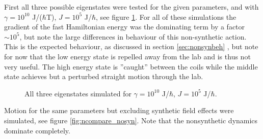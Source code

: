 \documentclass[main.tex]{subfiles}
\begin{document}
First all three possible eigenstates were tested for the given parameters, and with
\(\gamma = 10^{10}\) J/(\(\hbar{}\)T), \(J = 10^5\) J/\(\hbar{}\), see figure
\ref{fig:ncompare}. For all of these simulations the gradient of the fast Hamiltonian
energy was the dominating term by a factor \(\sim 10^{5}\), but note the large differences
in behaviour of this non-synthetic action. This is the expected behaviour, as discussed in
section \ref{sec:nonsynbeh}
, but note for now that the low energy state is repelled away from the lab and is thus not
very useful. The high energy state is ''caught'' between the coils while the middle state
achieves but a perturbed straight motion through the lab.
\begin{figure}[h]
    \centering
    \qquad
    \qquad
    \caption{\centering All three eigenstates simulated for \(\gamma = 10^{10}\) J/\(\hbar{}\), \(J = 10^5\)
    J/\(\hbar{}\).}%
    \label{fig:ncompare}
\end{figure}
Motion for the same parameters but excluding synthetic field effects were simulated, see
figure \ref{fig:ncompare_nosyn}. Note that the nonsynthetic dynamics dominate completely.
\end{document}
